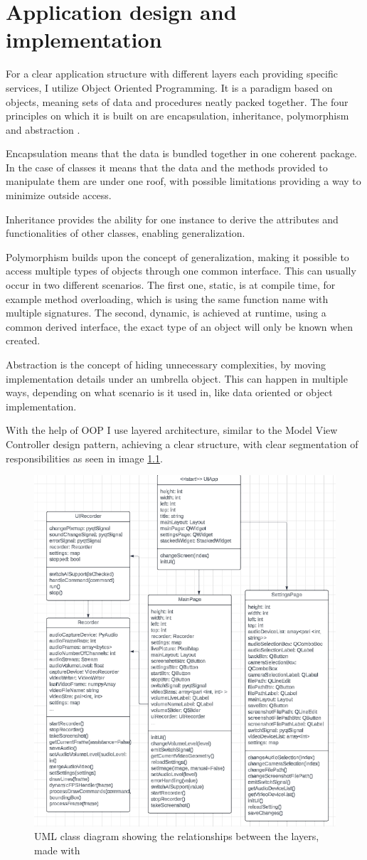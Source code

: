 \chapter{Application design and implementation}
\label{chap:design}

\par For a clear application structure with different layers each providing specific services, I utilize Object Oriented Programming. It is a paradigm based on objects, meaning sets of data and procedures neatly packed together. The four principles on which it is built on are encapsulation, inheritance, polymorphism and abstraction \cite{Blaschek1994}.
\par Encapsulation means that the data is bundled together in one coherent package. In the case of classes it means that the data and the methods provided to manipulate them are under one roof, with possible limitations providing a way to minimize outside access.  
\par Inheritance provides the ability for one instance to derive the attributes and functionalities of other classes, enabling generalization. 
\par Polymorphism builds upon the concept of generalization, making it possible to access multiple types of objects through one common interface. This can usually occur in two different scenarios. The first one, static, is at compile time, for example method overloading, which is using the same function name with multiple signatures. The second, dynamic, is achieved at runtime, using a common derived interface, the exact type of an object will only be known when created. 
\par Abstraction is the concept of hiding unnecessary complexities, by moving  implementation details under an umbrella object. This can happen in multiple ways, depending on what scenario is it used in, like data oriented or object implementation. 
\par With the help of OOP I use layered architecture, similar to the Model View Controller design pattern, achieving a clear structure, with clear segmentation of responsibilities as seen in image \ref{fig:umldiagram}.

\begin{figure}
    \centering
    \includegraphics[width=0.5\linewidth]{figures/UML-Diagram.png}
    \caption{UML class diagram showing the relationships between the layers, made with \cite{lucidchart}}
    \label{fig:umldiagram}
\end{figure}

